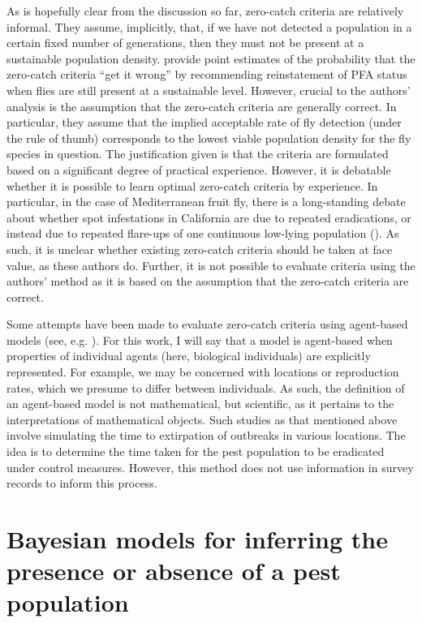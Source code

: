 \documentclass[
  oneside]{book}
\begin{document}
As is hopefully clear from the discussion so far, zero-catch criteria are relatively informal. They assume, implicitly, that, if we have not detected a population in a certain fixed number of generations, then they must not be present at a sustainable population density. \citet{meats2005} provide point estimates of the probability that the zero-catch criteria ``get it wrong'' by recommending reinstatement of PFA status when flies are still present at a sustainable level. However, crucial to the authors' analysis is the assumption that the zero-catch criteria are generally correct. In particular, they assume that the implied acceptable rate of fly detection (under the rule of thumb) corresponds to the lowest viable population density for the fly species in question. The justification given is that the criteria are formulated based on a significant degree of practical experience. However, it is debatable whether it is possible to learn optimal zero-catch criteria by experience. In particular, in the case of Mediterranean fruit fly, there is a long-standing debate about whether spot infestations in California are due to repeated eradications, or instead due to repeated flare-ups of one continuous low-lying population (\citet{carey2017}). As such, it is unclear whether existing zero-catch criteria should be taken at face value, as these authors do. Further, it is not possible to evaluate criteria using the authors' method as it is based on the assumption that the zero-catch criteria are correct.

Some attempts have been made to evaluate zero-catch criteria using agent-based models (see, e.g. \citet{collier2017}). For this work, I will say that a model is agent-based when properties of individual agents (here, biological individuals) are explicitly represented. For example, we may be concerned with locations or reproduction rates, which we presume to differ between individuals. As such, the definition of an agent-based model is not mathematical, but scientific, as it pertains to the interpretations of mathematical objects. Such studies as that mentioned above involve simulating the time to extirpation of outbreaks in various locations. The idea is to determine the time taken for the pest population to be eradicated under control measures. However, this method does not use information in survey records to inform this process.

\hypertarget{bayesian-models-for-inferring-the-presence-or-absence-of-a-pest-population}{%
\section{Bayesian models for inferring the presence or absence of a pest population}\label{bayesian-models-for-inferring-the-presence-or-absence-of-a-pest-population}}
\end{document}
